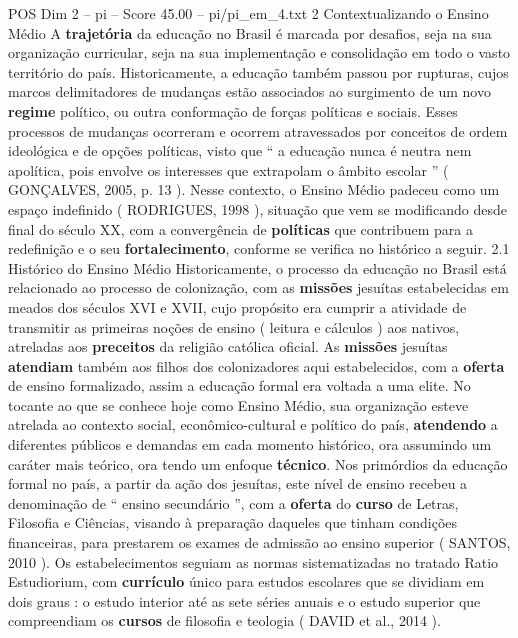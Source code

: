 \begin{textsample}{POS Dim 2 – pi – Score 45.00 – pi/pi\_em\_4.txt}  \label{ex:f2_pos_091}
2 Contextualizando o Ensino Médio A \textbf{trajetória} da educação no Brasil é marcada por desafios, seja na sua organização curricular, seja na sua implementação e consolidação em todo o vasto território do país.
Historicamente, a educação também passou por rupturas, cujos marcos delimitadores de mudanças estão associados ao surgimento de um novo \textbf{regime} político, ou outra conformação de forças políticas e sociais.
Esses processos de mudanças ocorreram e ocorrem atravessados por conceitos de ordem ideológica e de opções políticas, visto que “ a educação nunca é neutra nem apolítica, pois envolve os interesses que extrapolam o âmbito escolar ” ( GONÇALVES, 2005, p. 13 ).
Nesse contexto, o Ensino Médio padeceu como um espaço indefinido ( RODRIGUES, 1998 ), situação que vem se modificando desde final do século XX, com a convergência de \textbf{políticas} que contribuem para a redefinição e o seu \textbf{fortalecimento}, conforme se verifica no histórico a seguir. 2.1 Histórico do Ensino Médio Historicamente, o processo da educação no Brasil está relacionado ao processo de colonização, com as \textbf{missões} jesuítas estabelecidas em meados dos séculos XVI e XVII, cujo propósito era cumprir a atividade de transmitir as primeiras noções de ensino ( leitura e cálculos ) aos nativos, atreladas aos \textbf{preceitos} da religião católica oficial.
As \textbf{missões} jesuítas \textbf{atendiam} também aos filhos dos colonizadores aqui estabelecidos, com a \textbf{oferta} de ensino formalizado, assim a educação formal era voltada a uma elite.
No tocante ao que se conhece hoje como Ensino Médio, sua organização esteve atrelada ao contexto social, econômico-cultural e político do país, \textbf{atendendo} a diferentes públicos e demandas em cada momento histórico, ora assumindo um caráter mais teórico, ora tendo um enfoque \textbf{técnico}.
Nos primórdios da educação formal no país, a partir da ação dos jesuítas, este nível de ensino recebeu a denominação de “ ensino secundário ”, com a \textbf{oferta} do \textbf{curso} de Letras, Filosofia e Ciências, visando à preparação daqueles que tinham condições financeiras, para prestarem os exames de admissão ao ensino superior ( SANTOS, 2010 ).
Os estabelecimentos seguiam as normas sistematizadas no tratado Ratio Estudiorium, com \textbf{currículo} único para estudos escolares que se dividiam em dois graus : o estudo interior até as sete séries anuais e o estudo superior que compreendiam os \textbf{cursos} de filosofia e teologia ( DAVID et al., 2014 ).

\end{textsample}
